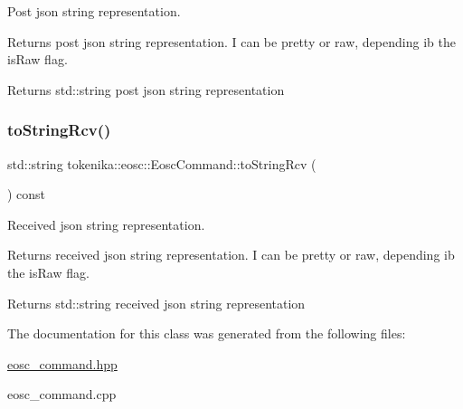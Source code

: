 Post json string representation. 

Returns post json string representation. I can be pretty or raw, depending ib the {\ttfamily is\+Raw} flag.

\begin{DoxyReturn}{Returns}
std\+::string post json string representation 
\end{DoxyReturn}
\mbox{\label{classtokenika_1_1eosc_1_1_eosc_command_ad01ef46444d9d8bc708b5d18605c3903}} 
\subsubsection{\texorpdfstring{to\+String\+Rcv()}{toStringRcv()}}
{\footnotesize\ttfamily std\+::string tokenika\+::eosc\+::\+Eosc\+Command\+::to\+String\+Rcv (\begin{DoxyParamCaption}{ }\end{DoxyParamCaption}) const}



Received json string representation. 

Returns received json string representation. I can be pretty or raw, depending ib the {\ttfamily is\+Raw} flag.

\begin{DoxyReturn}{Returns}
std\+::string received json string representation 
\end{DoxyReturn}


The documentation for this class was generated from the following files\+:\begin{DoxyCompactItemize}
\item 
\hyperlink{eosc__command_8hpp}{eosc\+\_\+command.\+hpp}\item 
eosc\+\_\+command.\+cpp\end{DoxyCompactItemize}
